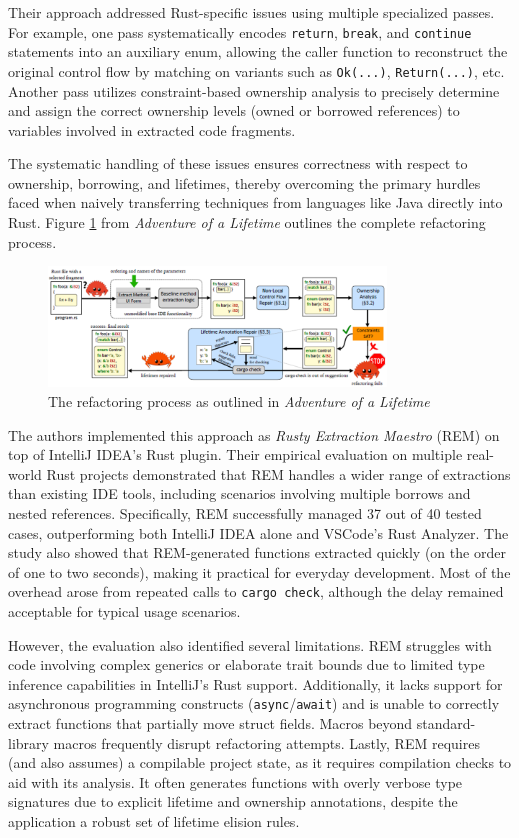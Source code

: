 Their approach addressed Rust-specific issues using multiple specialized passes.
For example, one pass systematically encodes \texttt{return}, \texttt{break},
and \texttt{continue} statements into an auxiliary enum, allowing the caller
function to reconstruct the original control flow by matching on variants such
as \texttt{Ok(...)}, \texttt{Return(...)}, etc. Another pass utilizes
constraint-based ownership analysis to precisely determine and assign the
correct ownership levels (owned or borrowed references) to variables involved in
extracted code fragments.

The systematic handling of these issues ensures correctness with respect to
ownership, borrowing, and lifetimes, thereby overcoming the primary hurdles
faced when naively transferring techniques from languages like Java directly
into Rust. Figure \ref{fig:aol_process} from \textit{Adventure of a Lifetime} outlines the complete
refactoring process.

\begin{figure}[H]
    \centering
    \includegraphics[width=0.8\textwidth]{Figures/AoL_algorithm.png}
    \caption{The refactoring process as outlined in \textit{Adventure of a Lifetime}}
    \label{fig:aol_process}
\end{figure}

The authors implemented this approach as \textit{Rusty Extraction Maestro} (REM)
on top of IntelliJ IDEA’s Rust plugin. Their empirical evaluation on multiple
real-world Rust projects demonstrated that REM handles a wider range of
extractions than existing IDE tools, including scenarios involving multiple
borrows and nested references. Specifically, REM successfully managed 37 out of
40 tested cases, outperforming both IntelliJ IDEA alone and VSCode’s Rust
Analyzer. The study also showed that REM-generated functions extracted quickly
(on the order of one to two seconds), making it practical for everyday
development. Most of the overhead arose from repeated calls to \texttt{cargo
check}, although the delay remained acceptable for typical usage scenarios.

However, the evaluation also identified several limitations. REM struggles with
code involving complex generics or elaborate trait bounds due to limited type
inference capabilities in IntelliJ's Rust support. Additionally, it lacks
support for asynchronous programming constructs (\texttt{async}/\texttt{await})
and is unable to correctly extract functions that partially move struct fields.
Macros beyond standard-library macros frequently disrupt refactoring attempts.
Lastly, REM requires (and also assumes) a compilable project state, as it
requires compilation checks to aid with its analysis. It often generates
functions with overly verbose type signatures due to explicit lifetime and
ownership annotations, despite the application a robust set of lifetime elision
rules.


